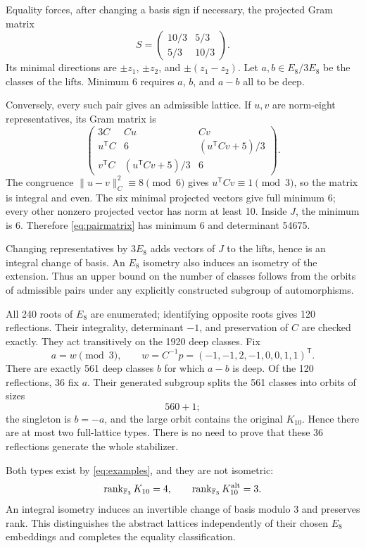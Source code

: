 \documentclass[11pt,a4paper]{article}
\theoremstyle{remark}\newtheorem{remark}[theorem]{Remark}
\newcommand{\Kalt}{K_{10}^{\mathrm{alt}}}
\begin{document}
Equality forces, after changing a basis sign if necessary, the projected Gram matrix
\begin{equation}\label{eq:binaryprojection}
S=\begin{pmatrix}10/3&5/3\\5/3&10/3\end{pmatrix}.
\end{equation}
Its minimal directions are $\pm z_1$, $\pm z_2$, and $\pm(z_1-z_2)$. Let $a,b\in E_8/3E_8$ be the classes of the lifts. Minimum 6 requires $a$, $b$, and $a-b$ all to be deep.

Conversely, every such pair gives an admissible lattice. If $u,v$ are norm-eight representatives, its Gram matrix is
\begin{equation}\label{eq:pairmatrix}
\begin{pmatrix}
3C&Cu&Cv\\
u^{\mathsf T}C&6&(u^{\mathsf T}Cv+5)/3\\
v^{\mathsf T}C&(u^{\mathsf T}Cv+5)/3&6
\end{pmatrix}.
\end{equation}
The congruence $\|u-v\|_C^2\equiv8\pmod6$ gives $u^{\mathsf T}Cv\equiv1\pmod3$, so the matrix is integral and even. The six minimal projected vectors give full minimum 6; every other nonzero projected vector has norm at least 10. Inside $J$, the minimum is 6. Therefore \eqref{eq:pairmatrix} has minimum 6 and determinant 54675.

Changing representatives by $3E_8$ adds vectors of $J$ to the lifts, hence is an integral change of basis. An $E_8$ isometry also induces an isometry of the extension. Thus an upper bound on the number of classes follows from the orbits of admissible pairs under any explicitly constructed subgroup of automorphisms.

All 240 roots of $E_8$ are enumerated; identifying opposite roots gives 120 reflections. Their integrality, determinant $-1$, and preservation of $C$ are checked exactly. They act transitively on the 1920 deep classes. Fix
\[
a=w\pmod3,\qquad w=C^{-1}p=(-1,-1,2,-1,0,0,1,1)^{\mathsf T}.
\]
There are exactly 561 deep classes $b$ for which $a-b$ is deep. Of the 120 reflections, 36 fix $a$. Their generated subgroup splits the 561 classes into orbits of sizes
\[
560+1;
\]
the singleton is $b=-a$, and the large orbit contains the original $K_{10}$. Hence there are at most two full-lattice types. There is no need to prove that these 36 reflections generate the whole stabilizer.

Both types exist by \eqref{eq:examples}, and they are not isometric:
\[
\rank_{\F_3}K_{10}=4,\qquad \rank_{\F_3}\Kalt=3.
\]
An integral isometry induces an invertible change of basis modulo 3 and preserves rank. This distinguishes the abstract lattices independently of their chosen $E_8$ embeddings and completes the equality classification.
\end{document}
